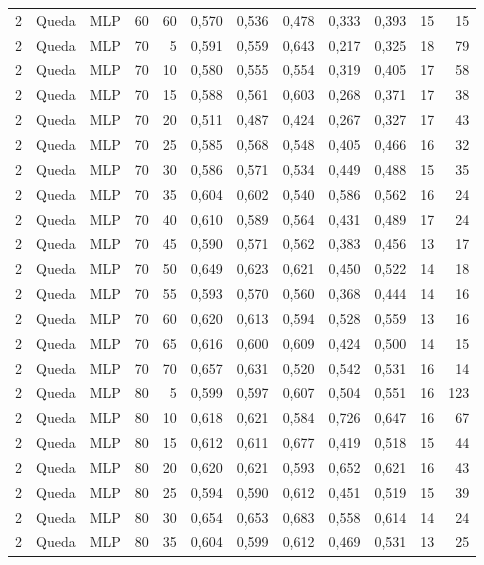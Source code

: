 \begin{longtable}{@{}rllrrrrrrrrr@{}}
2 & Queda & MLP & 60 & 60 & 0,570 & 0,536 & 0,478 & 0,333 & 0,393 & 15 & 15 \\
2 & Queda & MLP & 70 & 5 & 0,591 & 0,559 & 0,643 & 0,217 & 0,325 & 18 & 79 \\
2 & Queda & MLP & 70 & 10 & 0,580 & 0,555 & 0,554 & 0,319 & 0,405 & 17 & 58 \\
2 & Queda & MLP & 70 & 15 & 0,588 & 0,561 & 0,603 & 0,268 & 0,371 & 17 & 38 \\
2 & Queda & MLP & 70 & 20 & 0,511 & 0,487 & 0,424 & 0,267 & 0,327 & 17 & 43 \\
2 & Queda & MLP & 70 & 25 & 0,585 & 0,568 & 0,548 & 0,405 & 0,466 & 16 & 32 \\
2 & Queda & MLP & 70 & 30 & 0,586 & 0,571 & 0,534 & 0,449 & 0,488 & 15 & 35 \\
2 & Queda & MLP & 70 & 35 & 0,604 & 0,602 & 0,540 & 0,586 & 0,562 & 16 & 24 \\
2 & Queda & MLP & 70 & 40 & 0,610 & 0,589 & 0,564 & 0,431 & 0,489 & 17 & 24 \\
2 & Queda & MLP & 70 & 45 & 0,590 & 0,571 & 0,562 & 0,383 & 0,456 & 13 & 17 \\
2 & Queda & MLP & 70 & 50 & 0,649 & 0,623 & 0,621 & 0,450 & 0,522 & 14 & 18 \\
2 & Queda & MLP & 70 & 55 & 0,593 & 0,570 & 0,560 & 0,368 & 0,444 & 14 & 16 \\
2 & Queda & MLP & 70 & 60 & 0,620 & 0,613 & 0,594 & 0,528 & 0,559 & 13 & 16 \\
2 & Queda & MLP & 70 & 65 & 0,616 & 0,600 & 0,609 & 0,424 & 0,500 & 14 & 15 \\
2 & Queda & MLP & 70 & 70 & 0,657 & 0,631 & 0,520 & 0,542 & 0,531 & 16 & 14 \\
2 & Queda & MLP & 80 & 5 & 0,599 & 0,597 & 0,607 & 0,504 & 0,551 & 16 & 123 \\
2 & Queda & MLP & 80 & 10 & 0,618 & 0,621 & 0,584 & 0,726 & 0,647 & 16 & 67 \\
2 & Queda & MLP & 80 & 15 & 0,612 & 0,611 & 0,677 & 0,419 & 0,518 & 15 & 44 \\
2 & Queda & MLP & 80 & 20 & 0,620 & 0,621 & 0,593 & 0,652 & 0,621 & 16 & 43 \\
2 & Queda & MLP & 80 & 25 & 0,594 & 0,590 & 0,612 & 0,451 & 0,519 & 15 & 39 \\
2 & Queda & MLP & 80 & 30 & 0,654 & 0,653 & 0,683 & 0,558 & 0,614 & 14 & 24 \\
2 & Queda & MLP & 80 & 35 & 0,604 & 0,599 & 0,612 & 0,469 & 0,531 & 13 & 25 \\

\end{longtable}
